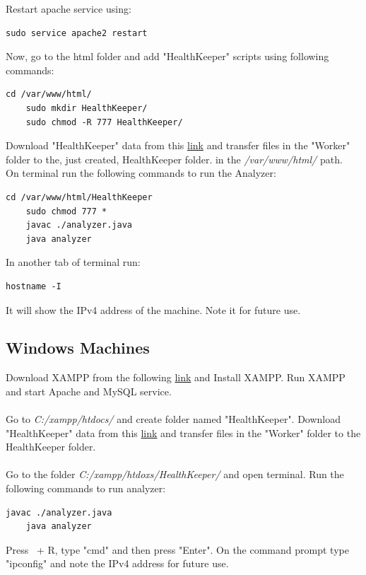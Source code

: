 \documentclass{article}
\begin{document}
Restart apache service using:
\begin{lstlisting}[style=BashInputStyle]
    sudo service apache2 restart
\end{lstlisting}
Now, go to the html folder and add "HealthKeeper" scripts using following commands:
\begin{lstlisting}[style=BashInputStyle]
    cd /var/www/html/
    sudo mkdir HealthKeeper/
    sudo chmod -R 777 HealthKeeper/
\end{lstlisting}
Download "HealthKeeper" data from this \href{https://drive.google.com/open?id=1DZWaJHHNMrJFnsCfxoWSIpfDhK7n-qHH}{link} and transfer files in the "Worker" folder to the, just created, HealthKeeper folder. in the \textit{/var/www/html/} path.\\
On terminal run the following commands to run the Analyzer:
\begin{lstlisting}[style=BashInputStyle]
    cd /var/www/html/HealthKeeper
    sudo chmod 777 *
    javac ./analyzer.java
    java analyzer
\end{lstlisting}
In another tab of terminal run:
\begin{lstlisting}[style=BashInputStyle]
    hostname -I
\end{lstlisting}
It will show the IPv4 address of the machine. Note it for future use.

\subsection{Windows Machines}
Download XAMPP from the following \href{https://www.apachefriends.org/xampp-files/7.2.6/xampp-win32-7.2.6-0-VC15-installer.exe}{link} and Install XAMPP. Run XAMPP and start Apache and MySQL service.\\ \\
Go to \textit{C:/xampp/htdocs/} and create folder named "HealthKeeper". Download "HealthKeeper" data from this \href{https://drive.google.com/open?id=1DZWaJHHNMrJFnsCfxoWSIpfDhK7n-qHH}{link} and transfer files in the "Worker" folder to the HealthKeeper folder.\\ \\
Go to the folder \textit{C:/xampp/htdoxs/HealthKeeper/} and open terminal. Run the following commands to run analyzer:
\begin{lstlisting}[style=BashInputStyle]
    javac ./analyzer.java
    java analyzer
\end{lstlisting}
Press \faWindows \ + R, type "cmd" and then press "Enter". On the command prompt type "ipconfig" and note the IPv4 address for future use.
\end{document}
